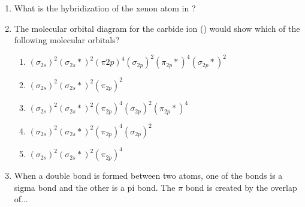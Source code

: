 \documentclass[main.tex]{subfiles}
\begin{document}
\begin{fullwidth}
\begin{multicols}{2}
\begin{enumerate}[resume]
\item What is the hybridization of the xenon atom in ?
\begin{enumerate}[label=(\alph*)]\vspace{-0.5cm}
\end{enumerate}\vspace{-0.5cm}

\item The molecular orbital diagram for the carbide ion () would show which of the following molecular orbitals?
\begin{enumerate}[label=(\alph*)] 
\item  $(\sigma_{2s})^2 (\sigma_{2s}*)^2 (\pi 2p)^4 (\sigma_{2p})^2 (\pi_{2p}*)^4 (\sigma_{2p}*)^2$	
\item  $(\sigma_{2s})^2 (\sigma_{2s}*)^2 (\pi_{2p})^2	$		
\item  $(\sigma_{2s})^2 (\sigma_{2s}*)^2 (\pi_{2p})^4 (\sigma_{2p})^2 (\pi_{2p}*)^4$ 
\item  $(\sigma_{2s})^2 (\sigma_{2s}*)^2 (\pi_{2p})^4 (\sigma_{2p})^2$	
\item  $(\sigma_{2s})^2 (\sigma_{2s}*)^2 (\pi_{2p})^4$	
\end{enumerate} 
		
\item When a double bond is formed between two atoms, one of the bonds is a sigma bond and the other is a pi bond. The $\pi$  bond is created by the overlap of...
\begin{enumerate}[label=(\alph*)]\vspace{-0.5cm}
\end{enumerate}\vspace{-0.5cm}
		

\end{enumerate}
\end{multicols}
\end{fullwidth}
\end{document}

